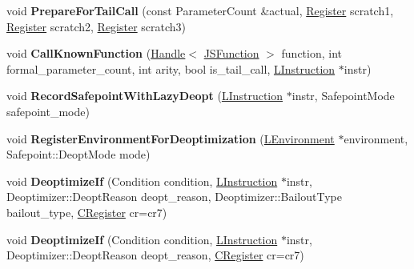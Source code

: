 \begin{DoxyCompactItemize}
\item 
void {\bfseries Prepare\+For\+Tail\+Call} (const Parameter\+Count \&actual, \hyperlink{structv8_1_1internal_1_1_register}{Register} scratch1, \hyperlink{structv8_1_1internal_1_1_register}{Register} scratch2, \hyperlink{structv8_1_1internal_1_1_register}{Register} scratch3)\hypertarget{classv8_1_1internal_1_1_l_code_gen_ac244b5f30d2995d51f6d263358a7ccd9}{}\label{classv8_1_1internal_1_1_l_code_gen_ac244b5f30d2995d51f6d263358a7ccd9}

\item 
void {\bfseries Call\+Known\+Function} (\hyperlink{classv8_1_1internal_1_1_handle}{Handle}$<$ \hyperlink{classv8_1_1internal_1_1_j_s_function}{J\+S\+Function} $>$ function, int formal\+\_\+parameter\+\_\+count, int arity, bool is\+\_\+tail\+\_\+call, \hyperlink{classv8_1_1internal_1_1_l_instruction}{L\+Instruction} $\ast$instr)\hypertarget{classv8_1_1internal_1_1_l_code_gen_adec87ca608c3363d2fa40b37952378b9}{}\label{classv8_1_1internal_1_1_l_code_gen_adec87ca608c3363d2fa40b37952378b9}

\item 
void {\bfseries Record\+Safepoint\+With\+Lazy\+Deopt} (\hyperlink{classv8_1_1internal_1_1_l_instruction}{L\+Instruction} $\ast$instr, Safepoint\+Mode safepoint\+\_\+mode)\hypertarget{classv8_1_1internal_1_1_l_code_gen_ae96e1ea2617dfdd8a23b554d85bdd250}{}\label{classv8_1_1internal_1_1_l_code_gen_ae96e1ea2617dfdd8a23b554d85bdd250}

\item 
void {\bfseries Register\+Environment\+For\+Deoptimization} (\hyperlink{classv8_1_1internal_1_1_l_environment}{L\+Environment} $\ast$environment, Safepoint\+::\+Deopt\+Mode mode)\hypertarget{classv8_1_1internal_1_1_l_code_gen_a8e3566b9bf7194223c47e7dac6fd6a10}{}\label{classv8_1_1internal_1_1_l_code_gen_a8e3566b9bf7194223c47e7dac6fd6a10}

\item 
void {\bfseries Deoptimize\+If} (Condition condition, \hyperlink{classv8_1_1internal_1_1_l_instruction}{L\+Instruction} $\ast$instr, Deoptimizer\+::\+Deopt\+Reason deopt\+\_\+reason, Deoptimizer\+::\+Bailout\+Type bailout\+\_\+type, \hyperlink{structv8_1_1internal_1_1_c_register}{C\+Register} cr=cr7)\hypertarget{classv8_1_1internal_1_1_l_code_gen_a4807884218296a0645bb3b70516d29b9}{}\label{classv8_1_1internal_1_1_l_code_gen_a4807884218296a0645bb3b70516d29b9}

\item 
void {\bfseries Deoptimize\+If} (Condition condition, \hyperlink{classv8_1_1internal_1_1_l_instruction}{L\+Instruction} $\ast$instr, Deoptimizer\+::\+Deopt\+Reason deopt\+\_\+reason, \hyperlink{structv8_1_1internal_1_1_c_register}{C\+Register} cr=cr7)\hypertarget{classv8_1_1internal_1_1_l_code_gen_a922127daeb0fb08e7e6d6634da5d89fa}{}\label{classv8_1_1internal_1_1_l_code_gen_a922127daeb0fb08e7e6d6634da5d89fa}


\end{DoxyCompactItemize}

